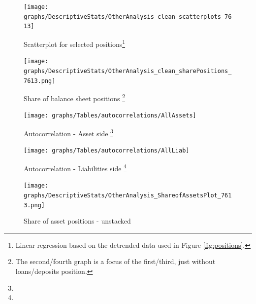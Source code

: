\documentclass[12pt, a4paper]{article} %
\begin{document}
\begin{figure}[hbtp]
\begin{minipage}{\textwidth}

\centering
\caption[1]{Scatterplot for selected positions\footnote{Linear regression based on the detrended data used in Figure \ref{fig:positions}.} }
\texttt{[image: graphs/DescriptiveStats/OtherAnalysis\_clean\_scatterplots\_7613]}
\label{fig:scatterplots}

\end{minipage}
\end{figure}


\begin{figure}[hbtp]
\begin{minipage}{\textwidth}

\centering
\caption[1]{Share of balance sheet positions \footnote{The second/fourth graph is a focus of the first/third, just without loans/deposits position.} }
\texttt{[image: graphs/DescriptiveStats/OtherAnalysis\_clean\_sharePositions\_7613.png]}
\label{fig:share_both}

\end{minipage}
\end{figure}



\begin{figure}[hbtp]
\begin{minipage}{\textwidth}

\centering
\caption[1]{Autocorrelation - Asset side \footnote{} }
\texttt{[image: graphs/Tables/autocorrelations/AllAssets]}
\label{fig:share_both}

\end{minipage}
\end{figure}

\begin{figure}[hbtp]
\begin{minipage}{\textwidth}

\centering
\caption[1]{Autocorrelation - Liabilities side \footnote{} }
\texttt{[image: graphs/Tables/autocorrelations/AllLiab]}
\label{fig:share_both}

\end{minipage}
\end{figure}


\iffalse
\begin{figure}[hbtp]
\centering
\caption{Share of asset positions - unstacked}
\texttt{[image: graphs/DescriptiveStats/OtherAnalysis\_ShareofAssetsPlot\_7613.png]}
\label{fig:sharepositions}
\end{figure}
\end{document}
